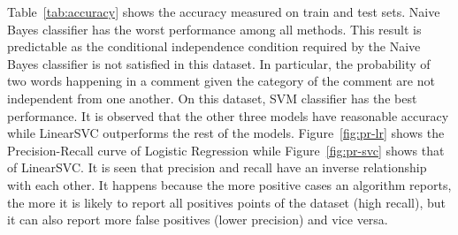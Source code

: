 Table~\ref{tab:accuracy} shows the accuracy measured on train and test sets. Naive Bayes classifier has the worst performance among all methods. This result is predictable as the conditional independence condition required by the Naive Bayes classifier is not satisfied in this dataset. In particular, the probability of two words happening in a comment given the category of the comment are not independent from one another. On this dataset, SVM classifier has the best performance. It is observed that the other three models have reasonable accuracy while LinearSVC outperforms the rest of the models. Figure~\ref{fig:pr-lr} shows the Precision-Recall curve of Logistic Regression while Figure~\ref{fig:pr-svc} shows that of LinearSVC. It is seen that precision and recall have an inverse relationship with each other. It happens because the more positive cases an algorithm reports, the more it is likely to report all positives points of the dataset (high recall), but it can also report more false positives (lower precision) and vice versa.

